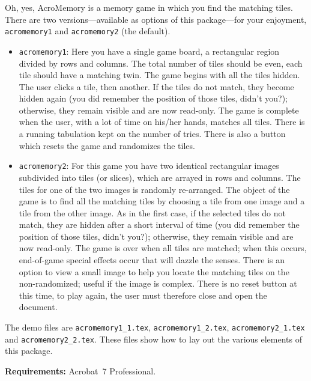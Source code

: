 \documentclass{article}
\begin{document}
Oh, yes, \textsf{AcroMemory} is a memory game in which you find the
matching tiles. There are two versions---available as options of
this package---for your enjoyment, \texttt{acromemory1} and
\texttt{acromemory2} (the default).
\begin{itemize}
   \item \texttt{acromemory1}: Here you have a single game board, a
        rectangular region divided by rows and columns. The total number
        of tiles should be even, each tile should have a matching twin.
        The game begins with all the tiles hidden. The user clicks a
        tile, then another. If the tiles do not match, they become
        hidden again (you did remember the position of those tiles,
        didn't you?); otherwise, they remain visible and are now
        read-only. The game is complete when the user, with a lot of time
        on his/her hands, matches all tiles. There is a running
        tabulation kept on the number of tries.  There is also a button
        which resets the game and randomizes the tiles.

  \item \texttt{acromemory2}: For this game you have two identical
        rectangular images subdivided into tiles (or slices), which
        are arrayed in rows and columns. The tiles for one of the
        two images is randomly re-arranged. The object of the
        game is to find all the matching tiles by choosing a tile
        from one image and a tile from the other image. As in the
        first case, if the selected tiles do not match, they are
        hidden after a short interval of time (you did remember the
        position of those tiles, didn't you?); otherwise, they
        remain visible and are now read-only. The game is over when
        all tiles are matched; when this occurs, end-of-game special
        effects occur that will dazzle the senses. There is an
        option to view a small image to help you locate the matching
        tiles on the non-randomized; useful if the image is complex.
        There is no reset button at this time, to play again, the
        user must therefore close and open the document.
\end{itemize}
The demo files are \texttt{acromemory1\_1.tex},
\texttt{acromemory1\_2.tex}, \texttt{acromemory2\_1.tex} and
\texttt{acromemory2\_2.tex}. These files show how to lay out the
various elements of this package.

\newtopic\textbf{Requirements:} Acrobat~7 Professional.
\end{document}
